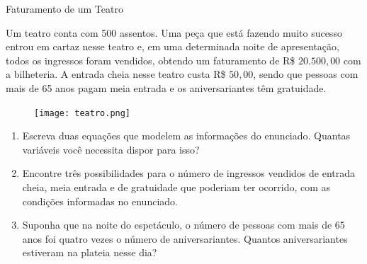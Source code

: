 \begin{task}{Faturamento de um Teatro}
\label{teatro}

Um teatro conta com 500 assentos. Uma peça que está fazendo muito sucesso entrou em cartaz nesse teatro e, em uma determinada noite de apresentação, todos os ingressos foram vendidos, obtendo um faturamento de R\$ $20.500{,}00$ com a bilheteria. A entrada cheia nesse teatro custa R\$ $50{,}00$, sendo que pessoas com mais de 65 anos pagam meia entrada e os aniversariantes têm gratuidade.

\begin{figure}[H]
\centering

\noindent\texttt{[image: teatro.png]}
\end{figure}
\begin{enumerate}

\item{}
Escreva duas equações que modelem as informações do enunciado. Quantas variáveis você necessita dispor para isso?

\item{}
Encontre três possibilidades para o número de ingressos vendidos de entrada cheia, meia entrada e de gratuidade que poderiam ter ocorrido, com as condições informadas no enunciado.

\item{}
Suponha que na noite do espetáculo, o número de pessoas com mais de 65 anos foi quatro vezes o número de aniversariantes. Quantos aniversariantes estiveram na plateia nesse dia?

\end{enumerate}

\end{task}

